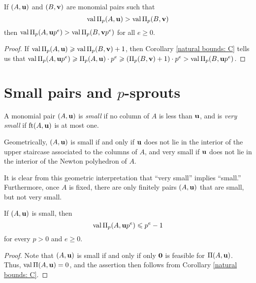 \documentclass[11pt]{amsart}
\renewcommand{\!}[1]{{\color{red}\text{$\star$\,}#1\,$\star$}}
\begin{document}
\begin{corollary}  If $(A, \mathbf{u})$ and $(B, \mathbf{v})$ are monomial pairs such that \[ \operatorname{val} \Pi_p(A, \mathbf{u}) > \operatorname{val} \Pi_p(B, \mathbf{v})\] then $\operatorname{val} \Pi_p(A, \mathbf{u}p^e) > \operatorname{val} \Pi_p(B, \mathbf{v}p^e)$ for all $e \geq 0$.
\end{corollary}

\begin{proof}   If $\operatorname{val} \Pi_p(A, \mathbf{u}) \geqslant \operatorname{val} \Pi_p(B, \mathbf{v}) + 1$, then Corollary \ref{natural bounds: C} tells us that 
$\operatorname{val} \Pi_p(A, \mathbf{u}p^e)  \geqslant \Pi_p(A, \mathbf{u}) \cdot p^e   \geqslant (\Pi_p(B, \mathbf{v})+1)\cdot p^e > \operatorname{val} \Pi_p(B, \mathbf{u}p^e)$.
\end{proof}

\section{Small pairs and $p$-sprouts}

 
\begin{definition}
A monomial pair $(A, \mathbf{u})$ is \emph{small} if no column of $A$ is less than $\mathbf{u}$, and is \emph{very small} if $\operatorname{ft}(A, \mathbf{u})$ is at most one.
\end{definition}

\begin{remark}
\label{finitely many small but not very small: R}
Geometrically, $(A, \mathbf{u})$ is small if and only if $\mathbf{u}$ does not lie in the interior of the upper staircase associated to the columns of $A$, and very small if $\mathbf{u}$ does not lie in the interior of the Newton polyhedron of $A$.  

It is clear from this geometric interpretation that ``very small'' implies ``small.''  Furthermore, once $A$ is fixed, there are only finitely pairs $(A, \mathbf{u})$ that are small, but not very small. 
\end{remark}

\begin{lemma}
\label{trivial value bound: L}
If $(A, \mathbf{u})$ is small, then 
 \[ \operatorname{val} \Pi_p(A, \mathbf{u}p^e) \leqslant p^{e} -1 \] for every $p > 0$ and $e \geq 0$.
\end{lemma}


\begin{proof}
Note that $(A, \mathbf{u})$ is small if and only if only $\mathbf{0}$ is feasible for $\Pi(A, \mathbf{u})$.   Thus, $\operatorname{val} \Pi(A, \mathbf{u}) = 0$, and the assertion then follows from Corollary \ref{natural bounds: C}.
\end{proof}
\end{document}
